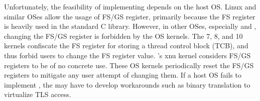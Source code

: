 Unfortunately, the feasibility of implementing 
depends on the host OS.
Linux and similar OSes allow the usage of FS/GS register,
primarily because the FS register is heavily used in the standard C library.
However, in other OSes, especially \win{} and \osx{},
changing the FS/GS register %
is forbidden by the OS kernels.
The \win{} 7, 8, and 10 kernels confiscate the FS register for storing a thread control block (TCB),
and thus forbid users to change the FS register value.
\osx{}'s xnu kernel considers FS/GS registers to be of no concrete use.
These OS kernels
periodically reset the FS/GS registers
to mitigate any user attempt
of changing them.
If a host OS fails to implement ,
the \libos{} may have to develop workarounds such as binary translation
to virtualize TLS access.









\label{sec:abi:proc}


